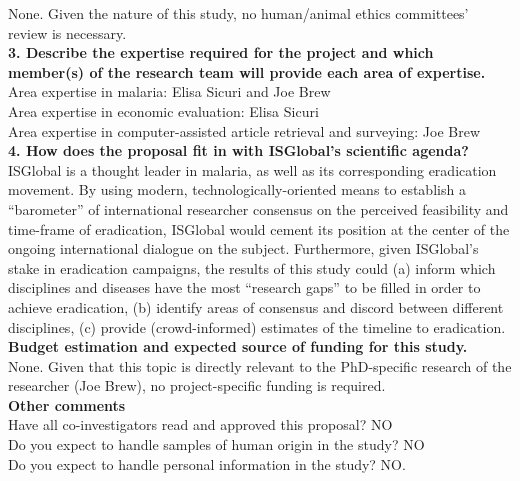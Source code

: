 \documentclass{article}
\begin{document}
\noindent None. Given the nature of this study, no human/animal ethics committees’ review is necessary. \\

\noindent \textbf{3. Describe the expertise required for the project and which member(s) of the research team will provide each area of expertise.} \\


\noindent Area expertise in malaria: Elisa Sicuri and Joe Brew \\
\noindent Area expertise in economic evaluation: Elisa Sicuri \\
\noindent Area expertise in computer-assisted article retrieval and surveying: Joe Brew \\


\noindent \textbf{4. How does the proposal fit in with ISGlobal’s scientific agenda?} \\ 


\noindent ISGlobal is a thought leader in malaria, as well as its corresponding eradication movement. By using modern, technologically-oriented means to establish a “barometer” of international researcher consensus on the perceived feasibility and time-frame of eradication, ISGlobal would cement its position at the center of the ongoing international dialogue on the subject. Furthermore, given ISGlobal’s stake in eradication campaigns, the results of this study could (a) inform which disciplines and diseases have the most “research gaps” to be filled in order to achieve eradication, (b) identify areas of consensus and discord between different disciplines, (c) provide (crowd-informed) estimates of the timeline to eradication. \\

\noindent \textbf{Budget estimation and expected source of funding for this study.} \\

\noindent None. Given that this topic is directly relevant to the PhD-specific research of the researcher (Joe Brew), no project-specific funding is required. \\

\noindent \textbf{Other comments} \\

\noindent Have all co-investigators read and approved this proposal? NO \\
\noindent Do you expect to handle samples of human origin in the study? NO \\
\noindent Do you expect to handle personal information in the study? NO. 
\end{document}
